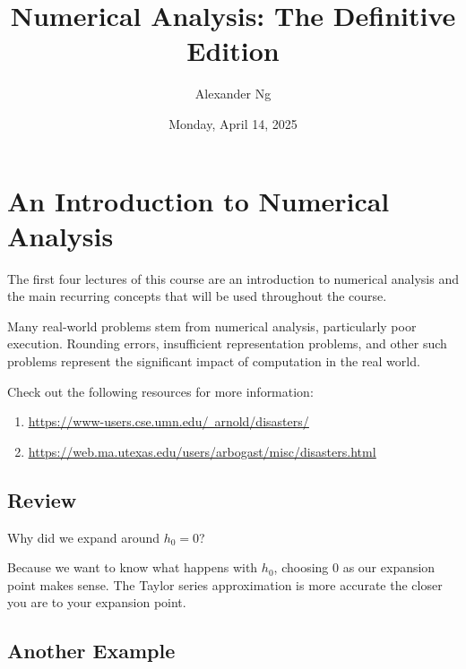 \documentclass[12pt]{book}
\newcommand{\ulhref}[2]{\href{#1}{\color{blue}\uline{#2}}}
\begin{document}
\title{Numerical Analysis: The Definitive Edition}
\author{Alexander Ng}
\date{Monday, April 14, 2025}

\maketitle

\tableofcontents
\clearpage

\chapter{An Introduction to Numerical Analysis}
\begin{greenquote}
  The first four lectures of this course are an introduction to numerical
  analysis and the main recurring concepts that will be used throughout the
  course.
\end{greenquote}
Many real-world problems stem from numerical analysis, particularly poor 
execution. Rounding errors, insufficient representation problems, and other 
such problems represent the significant impact of computation in the real world.

Check out the following resources for more information:
\begin{enumerate}
  \item \ulhref{https://www-users.cse.umn.edu/~arnold/disasters/}{https://www-users.cse.umn.edu/~arnold/disasters/}
  \item \ulhref{https://web.ma.utexas.edu/users/arbogast/misc/disasters.html}{https://web.ma.utexas.edu/users/arbogast/misc/disasters.html}
\end{enumerate}


% 
% 
% 
% 
\section{Review}

Why did we expand around $h_0 = 0$?

\quad Because we want to know what happens with $h_0$, choosing $0$ as our 
expansion point makes sense. The Taylor series approximation is more accurate 
the closer you are to your expansion point.


\section{Another Example}
\end{document}
